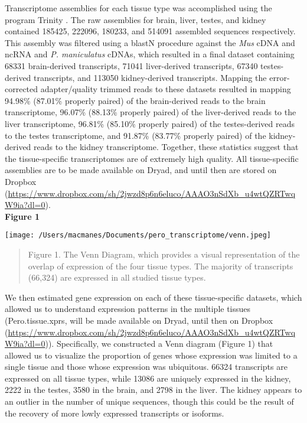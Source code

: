 \documentclass[12pt]{article}
\begin{document}
Transcriptome assemblies for each tissue type was accomplished using the program Trinity \citep{Haas:2013jq}. The raw assemblies for brain, liver, testes, and kidney contained 185425, 222096, 180233, and 514091 assembled sequences respectively. This assembly was filtered using a blastN procedure against the \textit{Mus} cDNA and ncRNA and \textit{P. maniculatus} cDNAs, which resulted in a final dataset containing 68331 brain-derived transcripts, 71041 liver-derived transcripts, 67340 testes-derived transcripts, and 113050 kidney-derived transcripts. Mapping the error-corrected adapter/quality trimmed reads to these datasets resulted in mapping 94.98\% (87.01\% properly paired) of the brain-derived reads to the brain transcriptome, 96.07\% (88.13\% properly paired) of the liver-derived reads to the liver transcriptome, 96.81\% (85.10\% properly paired) of the testes-derived reads to the testes transcriptome, and 91.87\% (83.77\% properly paired) of the kidney-derived reads to the kidney transcriptome. Together, these statistics suggest that the tissue-specific transcriptomes are of extremely high quality. All tissue-specific assemblies are to be made available on Dryad, and until then are stored on Dropbox (\url{https://www.dropbox.com/sh/2jwzd8p6n6eluco/AAAO3nSdXb_u4wtQZRTwqW9ia?dl=0}). \\

\textbf{\hypertarget{Figure 1}{Figure 1}} \\
\centerline{\texttt{[image: /Users/macmanes/Documents/pero\_transcriptome/venn.jpeg]}}
\begin{quote}
\small{Figure 1. The Venn Diagram, which provides a visual representation of the overlap of expression of the four tissue types. The majority of transcripts (66,324) are expressed in all studied tissue types.}
\end{quote}   

We then estimated gene expression on each of these tissue-specific datasets, which allowed us to understand expression patterns in the multiple tissues (Pero.tissue.xprs, will be made available on Dryad, until then on Dropbox (\url{https://www.dropbox.com/sh/2jwzd8p6n6eluco/AAAO3nSdXb_u4wtQZRTwqW9ia?dl=0})). Specifically, we constructed a Venn diagram ({\hypertarget{Figure 1}{Figure 1}}) that allowed us to visualize the proportion of genes whose expression was limited to a single tissue and those whose expression was ubiquitous. 66324 transcripts are expressed on all tissue types, while 13086 are uniquely expressed in the kidney, 2222 in the testes, 3580 in the brain, and 2798 in the liver. The kidney appears to an outlier in the number of unique sequences, though this could be the result of the recovery of more lowly expressed transcripts or isoforms.  \\
\end{document}
